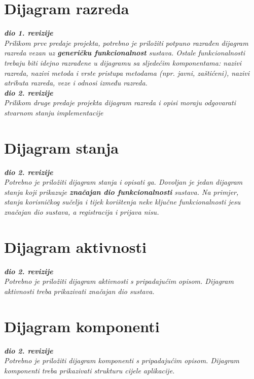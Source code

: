 			\eject
			
			
		\section{Dijagram razreda}
			
			\textbf{\textit{dio 1. revizije}}\\
			
			\textit{Prilikom prve predaje projekta, potrebno je priložiti potpuno razrađen dijagram razreda vezan uz \textbf{generičku funkcionalnost} sustava. Ostale funkcionalnosti trebaju biti idejno razrađene u dijagramu sa sljedećim komponentama: nazivi razreda, nazivi metoda i vrste pristupa metodama (npr. javni, zaštićeni), nazivi atributa razreda, veze i odnosi između razreda.}\\
			
			\textbf{\textit{dio 2. revizije}}\\			
			
			\textit{Prilikom druge predaje projekta dijagram razreda i opisi moraju odgovarati stvarnom stanju implementacije}
			
			
			
			\eject
		
		\section{Dijagram stanja}
			
			
			\textbf{\textit{dio 2. revizije}}\\
			
			\textit{Potrebno je priložiti dijagram stanja i opisati ga. Dovoljan je jedan dijagram stanja koji prikazuje \textbf{značajan dio funkcionalnosti} sustava. Na primjer, stanja korisničkog sučelja i tijek korištenja neke ključne funkcionalnosti jesu značajan dio sustava, a registracija i prijava nisu. }
			
			
			\eject 
		
		\section{Dijagram aktivnosti}
			
			\textbf{\textit{dio 2. revizije}}\\
			
			 \textit{Potrebno je priložiti dijagram aktivnosti s pripadajućim opisom. Dijagram aktivnosti treba prikazivati značajan dio sustava.}
			
			\eject
		\section{Dijagram komponenti}
		
			\textbf{\textit{dio 2. revizije}}\\
		
			 \textit{Potrebno je priložiti dijagram komponenti s pripadajućim opisom. Dijagram komponenti treba prikazivati strukturu cijele aplikacije.}
